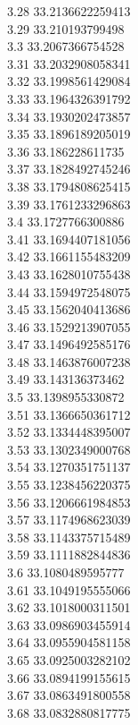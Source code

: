 {3.28	33.2136622259413\\
3.29	33.210193799498\\
3.3	33.2067366754528\\
3.31	33.2032908058341\\
3.32	33.1998561429084\\
3.33	33.1964326391792\\
3.34	33.1930202473857\\
3.35	33.1896189205019\\
3.36	33.186228611735\\
3.37	33.1828492745246\\
3.38	33.1794808625415\\
3.39	33.1761233296863\\
3.4	33.1727766300886\\
3.41	33.1694407181056\\
3.42	33.1661155483209\\
3.43	33.1628010755438\\
3.44	33.1594972548075\\
3.45	33.1562040413686\\
3.46	33.1529213907055\\
3.47	33.1496492585176\\
3.48	33.1463876007238\\
3.49	33.143136373462\\
3.5	33.1398955330872\\
3.51	33.1366650361712\\
3.52	33.1334448395007\\
3.53	33.1302349000768\\
3.54	33.1270351751137\\
3.55	33.1238456220375\\
3.56	33.1206661984853\\
3.57	33.1174968623039\\
3.58	33.1143375715489\\
3.59	33.1111882844836\\
3.6	33.1080489595777\\
3.61	33.1049195555066\\
3.62	33.1018000311501\\
3.63	33.0986903455914\\
3.64	33.0955904581158\\
3.65	33.0925003282102\\
3.66	33.0894199155615\\
3.67	33.0863491800558\\
3.68	33.0832880817775\\
}
